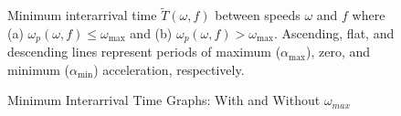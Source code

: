 \begin{figure}
\centering
      \label{fig:mintPeak}
  \label{mintPeak}
      \label{fig:mintMax}
  \label{mintMax}
\caption{Minimum Interarrival Time Graphs: With and Without $\omega_{max}$}Minimum interarrival time $\widetilde{T}(\omega,f)$ between speeds $\omega$ and $f$ where (a) $\omega_p(\omega,f) \leq \omega_{\max}$ and (b) $\omega_p(\omega,f) > \omega_{\max}$.
Ascending, flat, and descending lines represent periods of maximum ($\alpha_{\max}$), zero, and  minimum ($\alpha_{\min}$) acceleration, respectively.
\label{fig:mint}
\end{figure}


